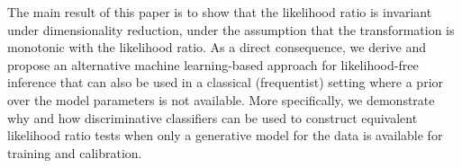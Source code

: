 \documentclass[12pt]{article}
\numberwithin{equation}{section}
\theoremstyle{plain}
\begin{document}
The main result of this paper is to show that the likelihood ratio is invariant
under dimensionality reduction, under the assumption that the transformation is
monotonic with the likelihood ratio. As a direct consequence, we derive and propose an
alternative machine learning-based approach for likelihood-free inference that
can also be used in a classical (frequentist) setting where a prior over the
model parameters is not available. More specifically, we demonstrate why and how
discriminative classifiers can be used to construct equivalent likelihood ratio
tests when only a generative model for the data is available for training and
calibration.

%
%
%
\end{document}
